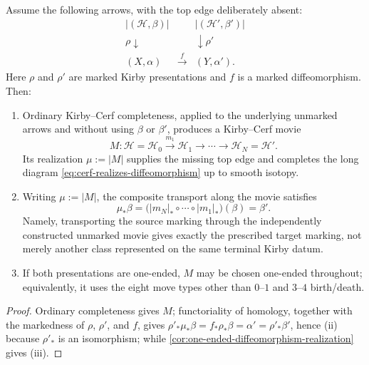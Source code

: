 \begin{theorem}
\label{prop:marked-kirby-cerf}
Assume the following arrows, with the top edge deliberately absent:
\[
\begin{array}{ccc}
  |(\mathcal H,\beta)| && |(\mathcal H',\beta')| \\
  {\scriptstyle\rho}\!\downarrow &&
    \downarrow\!{\scriptstyle\rho'} \\
  (X,\alpha) & \xrightarrow{\ f\ } & (Y,\alpha').
\end{array}
\]
Here \(\rho\) and \(\rho'\) are marked Kirby presentations and \(f\) is a
marked diffeomorphism.  Then:
\begin{enumerate}[label=\textup{(\roman*)},ref=\textup{\roman*}]
  \item Ordinary Kirby--Cerf completeness, applied to the underlying
  unmarked arrows and without using \(\beta\) or \(\beta'\), produces a
  Kirby--Cerf movie
  \[
    M\colon
    \mathcal H=\mathcal H_0
    \xrightarrow{m_1}\mathcal H_1
    \longrightarrow\cdots\longrightarrow
    \mathcal H_N=\mathcal H'.
  \]
  Its realization \(\mu:=|M|\) supplies the missing top edge and completes the
  long diagram \eqref{eq:cerf-realizes-diffeomorphism} up to smooth isotopy.

  \item Writing \(\mu:=|M|\), the composite transport along the movie
  satisfies
  \[
    \mu_*\beta
    =\bigl(|m_N|_*\circ\cdots\circ|m_1|_*\bigr)(\beta)
    =\beta'.
  \]
  Namely, transporting the source marking through the independently
  constructed unmarked movie gives exactly the prescribed target marking,
  not merely another class represented on the same terminal Kirby datum.

  \item If both presentations are one-ended, \(M\) may be chosen
  one-ended throughout; equivalently, it uses the eight move types other
  than \(0\)--\(1\) and \(3\)--\(4\) birth/death.
\end{enumerate}
\end{theorem}

\begin{proof}
Ordinary completeness gives \(M\); functoriality of homology, together with
the markedness of \(\rho\), \(\rho'\), and \(f\), gives
\(\rho'_*\mu_*\beta=f_*\rho_*\beta=\alpha'=\rho'_*\beta'\), hence (ii)
because \(\rho'_*\) is an isomorphism; while
\cref{cor:one-ended-diffeomorphism-realization} gives (iii).
\end{proof}
